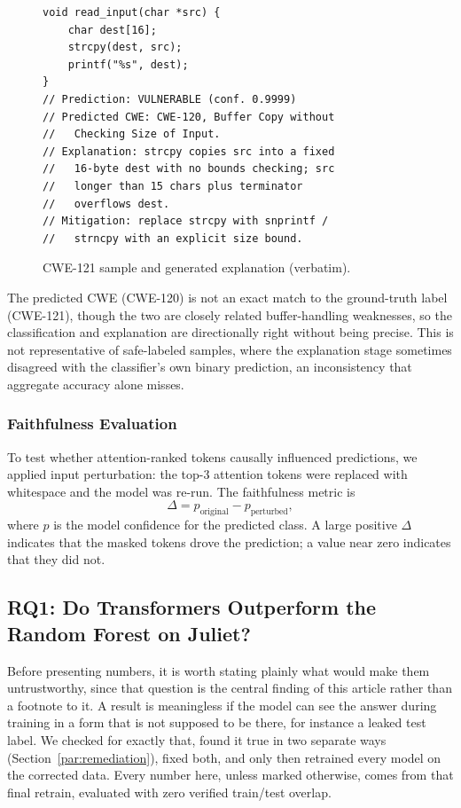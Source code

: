\documentclass{ieeeaccess}
\begin{document}
\begin{figure}[t]
\begin{lstlisting}
void read_input(char *src) {
    char dest[16];
    strcpy(dest, src);
    printf("%s", dest);
}
// Prediction: VULNERABLE (conf. 0.9999)
// Predicted CWE: CWE-120, Buffer Copy without
//   Checking Size of Input.
// Explanation: strcpy copies src into a fixed
//   16-byte dest with no bounds checking; src
//   longer than 15 chars plus terminator
//   overflows dest.
// Mitigation: replace strcpy with snprintf /
//   strncpy with an explicit size bound.
\end{lstlisting}
\caption{CWE-121 sample and generated explanation (verbatim).}
\label{lst:cwe121}
\end{figure}

The predicted CWE (CWE-120) is not an exact match to the ground-truth label (CWE-121), though the two are closely related buffer-handling weaknesses, so the classification and explanation are directionally right without being precise. This is not representative of safe-labeled samples, where the explanation stage sometimes disagreed with the classifier's own binary prediction, an inconsistency that aggregate accuracy alone misses.

\subsubsection{Faithfulness Evaluation}
\label{par:faithfulness-eval}
To test whether attention-ranked tokens causally influenced predictions, we applied input perturbation: the top-3 attention tokens were replaced with whitespace and the model was re-run. The faithfulness metric is
\begin{equation}
\Delta = p_{\text{original}} - p_{\text{perturbed}},
\label{eq:faithfulness}
\end{equation}
where $p$ is the model confidence for the predicted class. A large positive $\Delta$ indicates that the masked tokens drove the prediction; a value near zero indicates that they did not.

\subsection{RQ1: Do Transformers Outperform the Random Forest on Juliet?}
\label{subsec:rq1}
Before presenting numbers, it is worth stating plainly what would make them untrustworthy, since that question is the central finding of this article rather than a footnote to it. A result is meaningless if the model can see the answer during training in a form that is not supposed to be there, for instance a leaked test label. We checked for exactly that, found it true in two separate ways (Section~\ref{par:remediation}), fixed both, and only then retrained every model on the corrected data. Every number here, unless marked otherwise, comes from that final retrain, evaluated with zero verified train/test overlap.
\end{document}

